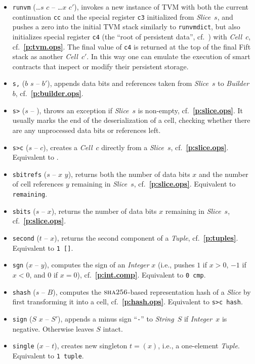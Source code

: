 \documentclass[12pt,oneside]{article}
\def\refpoint#1{{\rm\textbf{\ref{#1}}}}
\let\ptref=\refpoint
\def\opsc#1{\operatorname{\textsc{#1}}}
\def\Sha{\opsc{sha256}}
\begin{document}
\begin{itemize}
\item {\tt runvm} (\dots $s$ $c$ -- \dots $x$ $c'$), invokes a new instance of TVM with both the current continuation {\tt cc} and the special register {\tt c3} initialized from {\em Slice\/}~$s$, and pushes a zero into the initial TVM stack similarly to {\tt runvmdict}, but also initializes special register {\tt c4} (the ``root of persistent data'', cf.~\cite[1.4]{TVM}) with {\em Cell\/}~$c$, cf.~\ptref{p:tvm.ops}. The final value of {\tt c4} is returned at the top of the final Fift stack as another {\em Cell\/}~$c'$. In this way one can emulate the execution of smart contracts that inspect or modify their persistent storage.
\item {\tt s,} ($b$ $s$ -- $b'$), appends data bits and references taken from {\em Slice}~$s$ to {\em Builder}~$b$, cf.~\ptref{p:builder.ops}.
\item {\tt s>} ($s$ -- ), throws an exception if {\em Slice\/}~$s$ is non-empty, cf.~\ptref{p:slice.ops}. It usually marks the end of the deserialization of a cell, checking whether there are any unprocessed data bits or references left.
\item {\tt s>c} ($s$ -- $c$), creates a {\em Cell}~$c$ directly from a {\em Slice}~$s$, cf.~\ptref{p:slice.ops}. Equivalent to {\tt <b swap s, b>}.
\item {\tt sbitrefs} ($s$ -- $x$ $y$), returns both the number of data bits $x$ and the number of cell references $y$ remaining in {\em Slice}~$s$, cf.~\ptref{p:slice.ops}. Equivalent to {\tt remaining}.
\item {\tt sbits} ($s$ -- $x$), returns the number of data bits $x$ remaining in {\em Slice}~$s$, cf.~\ptref{p:slice.ops}.
\item {\tt second} ($t$ -- $x$), returns the second component of a {\em Tuple}, cf.~\ptref{p:tuples}. Equivalent to {\tt 1 []}.
\item {\tt sgn} ($x$ -- $y$), computes the sign of an {\em Integer\/} $x$ (i.e., pushes $1$ if $x>0$, $-1$ if $x<0$, and $0$ if $x=0$), cf.~\ptref{p:int.comp}. Equivalent to {\tt 0 cmp}.
\item {\tt shash} ($s$ -- $B$), computes the $\Sha$-based representation hash of a {\em Slice\/} by first transforming it into a cell, cf.~\ptref{p:hash.ops}. Equivalent to {\tt s>c hash}.
\item {\tt sign} ($S$ $x$ -- $S'$), appends a minus sign ``{\tt -}'' to {\em String\/}~$S$ if {\em Integer\/}~$x$ is negative. Otherwise leaves $S$ intact.
\item {\tt single} ($x$ -- $t$), creates new singleton $t=(x)$, i.e., a one-element {\em Tuple}. Equivalent to {\tt 1 tuple}.

\end{itemize}
\end{document}
